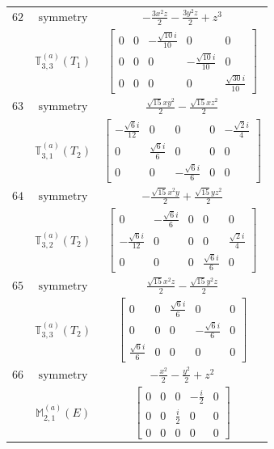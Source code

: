 \documentclass[fleqn,8pt,landscape]{jsarticle}
\begin{document}
\begin{longtable}{ccc}
$ 62 $ & $ \text{symmetry} $ & $ - \frac{3 x^{2} z}{2} - \frac{3 y^{2} z}{2} + z^{3} $ \\
$  $ & $ \mathbb{T}_{3,3}^{(a)}(T_{1}) $ & $ \begin{bmatrix} 0 & 0 & - \frac{\sqrt{10} i}{10} & 0 & 0 \\ 0 & 0 & 0 & - \frac{\sqrt{10} i}{10} & 0 \\ 0 & 0 & 0 & 0 & \frac{\sqrt{30} i}{10} \end{bmatrix} $ \\ \hline
$ 63 $ & $ \text{symmetry} $ & $ \frac{\sqrt{15} x y^{2}}{2} - \frac{\sqrt{15} x z^{2}}{2} $ \\
$  $ & $ \mathbb{T}_{3,1}^{(a)}(T_{2}) $ & $ \begin{bmatrix} - \frac{\sqrt{6} i}{12} & 0 & 0 & 0 & - \frac{\sqrt{2} i}{4} \\ 0 & \frac{\sqrt{6} i}{6} & 0 & 0 & 0 \\ 0 & 0 & - \frac{\sqrt{6} i}{6} & 0 & 0 \end{bmatrix} $ \\ \hline
$ 64 $ & $ \text{symmetry} $ & $ - \frac{\sqrt{15} x^{2} y}{2} + \frac{\sqrt{15} y z^{2}}{2} $ \\
$  $ & $ \mathbb{T}_{3,2}^{(a)}(T_{2}) $ & $ \begin{bmatrix} 0 & - \frac{\sqrt{6} i}{6} & 0 & 0 & 0 \\ - \frac{\sqrt{6} i}{12} & 0 & 0 & 0 & \frac{\sqrt{2} i}{4} \\ 0 & 0 & 0 & \frac{\sqrt{6} i}{6} & 0 \end{bmatrix} $ \\ \hline
$ 65 $ & $ \text{symmetry} $ & $ \frac{\sqrt{15} x^{2} z}{2} - \frac{\sqrt{15} y^{2} z}{2} $ \\
$  $ & $ \mathbb{T}_{3,3}^{(a)}(T_{2}) $ & $ \begin{bmatrix} 0 & 0 & \frac{\sqrt{6} i}{6} & 0 & 0 \\ 0 & 0 & 0 & - \frac{\sqrt{6} i}{6} & 0 \\ \frac{\sqrt{6} i}{6} & 0 & 0 & 0 & 0 \end{bmatrix} $ \\ \hline
$ 66 $ & $ \text{symmetry} $ & $ - \frac{x^{2}}{2} - \frac{y^{2}}{2} + z^{2} $ \\
$  $ & $ \mathbb{M}_{2,1}^{(a)}(E) $ & $ \begin{bmatrix} 0 & 0 & 0 & - \frac{i}{2} & 0 \\ 0 & 0 & \frac{i}{2} & 0 & 0 \\ 0 & 0 & 0 & 0 & 0 \end{bmatrix} $ \\ \hline

\end{longtable}
\end{document}
